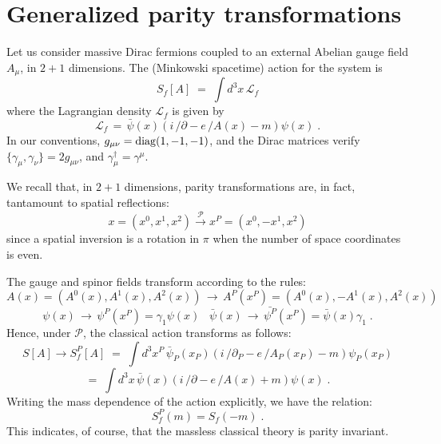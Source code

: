 \documentclass[a4paper,12pt]{article}
\newcommand{\spartial}{/\!\!\!\partial}
\newcommand{\Aslash}{/\!\!\!\!A}
\begin{document}
\section{Generalized parity transformations}\label{sec:sym}
Let us consider massive Dirac fermions coupled to an external Abelian
gauge field $A_{\mu}$, in $2+1$ dimensions. The (Minkowski spacetime)
action for the system is
\begin{equation}
S_f[A] \;=\; \int d^3x \, \mathcal{L}_f
\end{equation}
where the Lagrangian density $\mathcal{L}_f$ is given by
\begin{equation}
\mathcal{L}_f\,=\,\bar{\psi}(x)(i\,\spartial-e\,\Aslash(x)-m)\psi(x) \;.
\end{equation}
In our conventions, $g_{\mu\nu}={\rm diag}(1,-1,-1)$, and the
Dirac matrices verify
\mbox{$\{\gamma_{\mu},\gamma_{\nu}\}=2g_{\mu\nu}$}, and
$\gamma_{\mu}^\dagger=\gamma^{\mu}$.


We recall that, in $2+1$ dimensions, parity transformations are, in
fact, tantamount to spatial reflections:
\begin{equation}
\label{parity}
x=(x^0,x^1,x^2)  \stackrel{\mathcal{P}}{\longrightarrow}  x^P=(x^0,-x^1,x^2)
\end{equation}
since a spatial inversion is a rotation in $\pi$ when the number of
space coordinates is even.

The gauge and spinor fields transform according to the rules:
$$
A(x) =(A^0(x),A^1(x),A^2(x)) \, \to \,
A^P(x^P)=(A^0(x),-A^1(x),A^2(x))
$$
\begin{equation}
 \label{fieldsparity}
\psi(x) \, \to\, \psi^P(x^P)=\gamma_1\psi(x)
\;\;\; \bar{\psi}(x) \, \to \, \bar{\psi^P}(x^P) =
\bar{\psi}(x)\gamma_1 \;.
\end{equation}
Hence, under $\mathcal{P}$, the classical action transforms as
follows:
$$
S[A] \to S_f^P[A] \;=\; \int d^3x^P\,
\bar{\psi}_P(x_P)(i\,\spartial_P-e\,\Aslash_P(x_P)-m)\psi_P(x_P)
$$
\begin{equation}
=\;\int d^3x \, \bar{\psi}(x)(i\,\spartial-e\,\Aslash(x)+m)\psi(x) \;.
\end{equation}
Writing the mass dependence of the action explicitly, we have the
relation:
\begin{equation}
S_f^P(m)=S_f(-m) \;.
\end{equation}
%
This indicates, of course, that the massless classical theory is
parity invariant.
\end{document}
